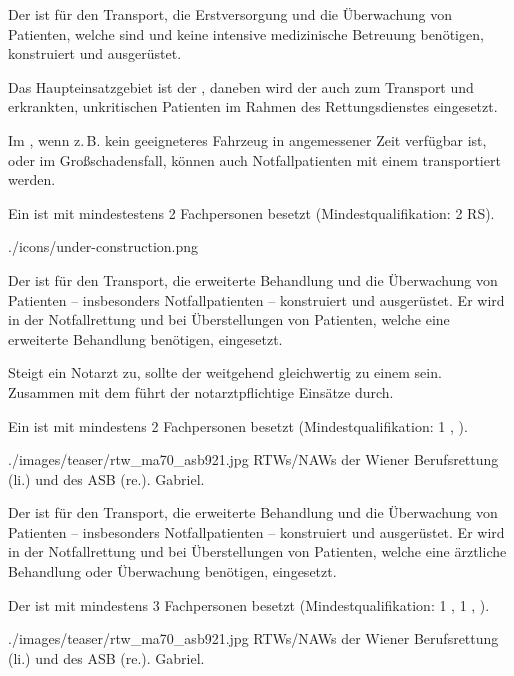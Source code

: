 {%
Der  ist für den Transport, die Erstversorgung und die Überwachung von
Patienten, welche  sind und keine intensive
medizinische Betreuung benötigen, konstruiert und ausgerüstet.

Das Haupteinsatzgebiet ist der , daneben wird der 
auch zum Transport und erkrankten, unkritischen Patienten im Rahmen des Rettungsdienstes
eingesetzt. 

Im , wenn z.\,B. kein geeigneteres Fahrzeug in angemessener
Zeit verfügbar ist, oder im Großschadensfall, können auch Notfallpatienten mit einem
 transportiert werden.

Ein  ist mit mindestestens 2 Fachpersonen besetzt
(Mindestqualifikation: 2 RS).

{\TakeNotesLarge}

}{

}
{./icons/under-construction.png}
{}
{}

{%
Der  ist für den Transport, die erweiterte Behandlung und die
Überwachung von Patienten -- insbesonders Notfallpatienten -- konstruiert und ausgerüstet.
Er wird in der Notfallrettung und bei Überstellungen von Patienten, welche eine erweiterte Behandlung benötigen,
eingesetzt.

Steigt ein Notarzt zu, sollte der  weitgehend gleichwertig zu einem
 sein. Zusammen mit dem 
führt der  notarztpflichtige Einsätze durch.

Ein  ist mit mindestens 2 Fachpersonen besetzt (Mindestqualifikation: 1
,  ).

{\TakeNotesLarge}
}{

}
{./images/teaser/rtw_ma70_asb921.jpg}
{RTWs/NAWs der Wiener Berufsrettung (li.) und des ASB (re.).}
{Gabriel.}


{%
Der  ist für den Transport, die erweiterte  Behandlung und
die Überwachung von Patienten -- insbesonders Notfallpatienten -- konstruiert und ausgerüstet.
Er wird in der Notfallrettung und bei Überstellungen von Patienten, welche eine
ärztliche Behandlung oder Überwachung benötigen, eingesetzt.

Der  ist mit mindestens 3 Fachpersonen besetzt (Mindestqualifikation: 1
, 1 ,  ).

{\TakeNotesLarge}


}{

}
{./images/teaser/rtw_ma70_asb921.jpg}
{RTWs/NAWs der Wiener Berufsrettung (li.) und des ASB (re.).}
{Gabriel.}


